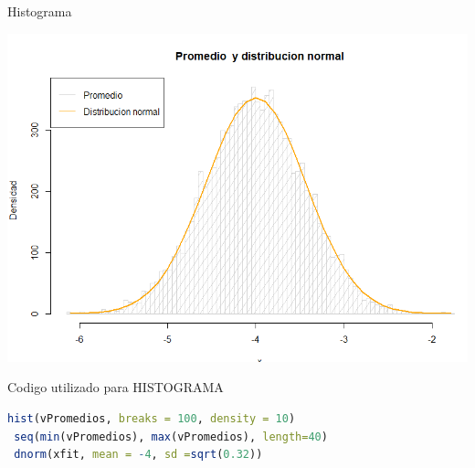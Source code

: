 \documentclass{beamer}
\begin{document}
\begin{frame}{Histograma}
    \begin{itemize}[<+-| alert@+>] %
        \includegraphics[width=0.99\linewidth]{pic/histograma.png}
    \end{itemize}
\end{frame}

\begin{frame}[fragile]{\R{} Codigo utilizado para HISTOGRAMA}

\begin{lstlisting}[language=R]
 hist(vPromedios, breaks = 100, density = 10) 
 seq(min(vPromedios), max(vPromedios), length=40)
 dnorm(xfit, mean = -4, sd =sqrt(0.32))

\end{lstlisting}
    \medskip
    \pause
\end{frame}
\end{document}
